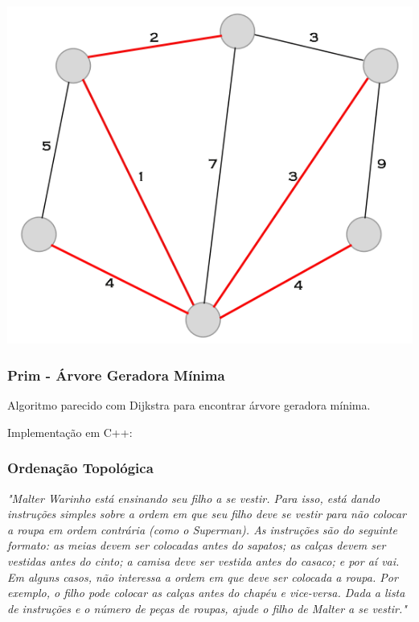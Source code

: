 \documentclass[a4paper,12pt]{article}
\begin{document}
\begin{center}
  \includegraphics[width=\linewidth/2]{figures/grafos/agm.png}
\end{center}

\subsubsection{Prim - Árvore Geradora Mínima}

Algoritmo parecido com Dijkstra para encontrar árvore geradora mínima.

\noindent Implementação em C++:

\subsubsection{Ordenação Topológica}

\textit{"Malter Warinho está ensinando seu filho a se vestir. Para isso, está dando instruções simples sobre a ordem em que seu filho deve se vestir para não colocar a roupa em ordem contrária (como o Superman). As instruções são do seguinte formato: as meias devem ser colocadas antes do sapatos; as calças devem ser vestidas antes do cinto; a camisa deve ser vestida antes do casaco; e por aí vai. Em alguns casos, não interessa a ordem em que deve ser colocada a roupa. Por exemplo, o filho pode colocar as calças antes do chapéu e vice-versa. Dada a lista de instruções e o número de peças de roupas, ajude o filho de Malter a se vestir."}\newline
\end{document}
